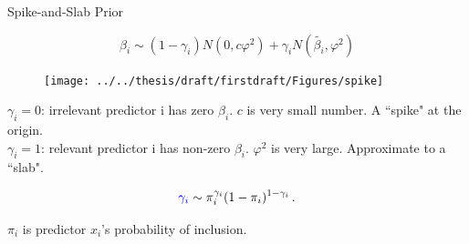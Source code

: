 \documentclass[14pt,xcolor=dvipsnames]{beamer}
\begin{document}



\begin{frame}{Spike-and-Slab Prior}
\begin{block}{}	
	$$\beta_i \sim (1-\gamma_i) N(0, c \varphi^2)+\gamma_i N(\tilde{\beta_i},\varphi^2)$$
\end{block}

\begin{minipage}{0.5\textwidth}
	\begin{figure}[H]
		\texttt{[image: ../../thesis/draft/firstdraft/Figures/spike]}
	\end{figure}
\end{minipage} \hfill
\begin{minipage}{0.45\textwidth}
$\gamma_i = 0$: irrelevant predictor i has zero $\beta_i$. $c$ is very small number. A ``spike" at the origin.\\
 $\gamma_i = 1$: relevant predictor i has non-zero $\beta_i$. $\varphi^2$ is very large. Approximate to a ``slab".
\end{minipage}

	
$$\textcolor{blue}{\gamma_i} \sim  \pi_{i}^{\gamma_i}(1- \pi_{i})^{1-\gamma_i} \, .$$ 


 $\pi_i$ is predictor $x_i$'s probability of inclusion.

\end{frame}




\end{document}
